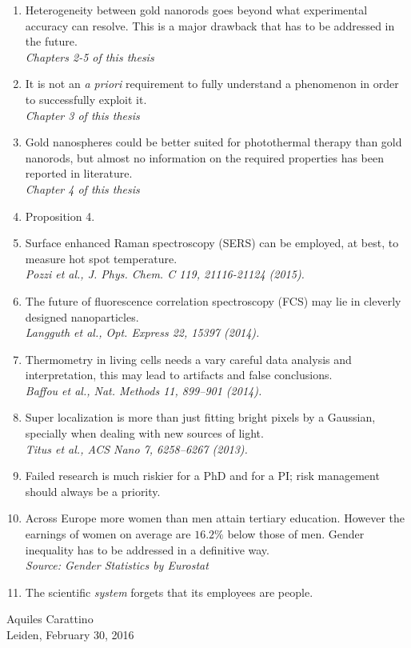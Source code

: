\documentclass{dissertation}
\begin{document}
\begin{enumerate}

\item Heterogeneity between gold nanorods goes beyond what experimental accuracy
can resolve. This is a major drawback that has to be addressed in the future. \\
\textit{Chapters 2-5 of this thesis} 

\item It is not an \textit{a priori} requirement to fully understand a
phenomenon in order to successfully exploit it.
\\
\textit{Chapter 3 of this thesis} 

\item Gold nanospheres could be better suited for photothermal therapy than gold
nanorods, but almost no information on the required properties has been reported
in literature. \\
\textit{Chapter 4 of this thesis}

\item Proposition 4.

\item Surface enhanced Raman spectroscopy (SERS) can be employed, at best, to
measure hot spot temperature. \\
\textit{Pozzi et al., J. Phys. Chem. C 119, 21116-21124 (2015).}

\item The future of fluorescence correlation spectroscopy (FCS) may lie in
cleverly designed nanoparticles. \\
\textit{Langguth et al., Opt. Express 22, 15397 (2014).}

\item Thermometry in living cells needs a vary careful data analysis and
interpretation, this may lead to artifacts and false conclusions. \\
\textit{Baffou et al., Nat. Methods 11, 899–901 (2014).}

\item Super localization is more than just fitting bright pixels by a Gaussian,
specially when dealing with new sources of light.\\
\textit{Titus et al., ACS Nano 7, 6258–6267 (2013).}

\item Failed research is much riskier for a PhD and for a PI; risk management
should always be a priority.

\item Across Europe more women than men attain tertiary education. However the
earnings of women on average are $16.2\%$ below those of men. Gender inequality
has to be addressed in a definitive way. \\
\textit{Source: Gender Statistics by Eurostat}

\item The scientific \textit{system} forgets that its employees are people.

\end{enumerate}

\bigskip
\bigskip

\begin{center}
Aquiles Carattino \\
Leiden, February 30, 2016
\end{center}
\end{document}
